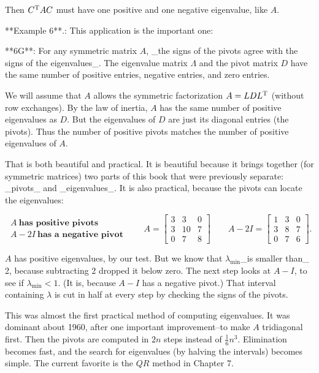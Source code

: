 Then \(C^{\rm T}AC\) must have one positive and one negative eigenvalue, like \(A\).

**Example 6**.: This application is the important one:

**6G**: For any symmetric matrix \(A\), _the signs of the pivots agree with the signs of the eigenvalues_. The eigenvalue matrix \(\Lambda\) and the pivot matrix \(D\) have the same number of positive entries, negative entries, and zero entries.

We will assume that \(A\) allows the symmetric factorization \(A=LDL^{\rm T}\) (without row exchanges). By the law of inertia, \(A\) has the same number of positive eigenvalues as \(D\). But the eigenvalues of \(D\) are just its diagonal entries (the pivots). Thus the number of positive pivots matches the number of positive eigenvalues of \(A\).

That is both beautiful and practical. It is beautiful because it brings together (for symmetric matrices) two parts of this book that were previously separate: _pivots_ and _eigenvalues_. It is also practical, because the pivots can locate the eigenvalues:

\[\begin{array}{l}A\ \textbf{has positive pivots}\\ A-2I\ \textbf{has a negative pivot}\end{array}\qquad A=\begin{bmatrix}3&3&0\\ 3&10&7\\ 0&7&8\end{bmatrix}\qquad A-2I=\begin{bmatrix}1&3&0\\ 3&8&7\\ 0&7&6\end{bmatrix}.\]

\(A\) has positive eigenvalues, by our test. But we know that \(\lambda_{\min}\)_is smaller than_ 2, because subtracting 2 dropped it below zero. The next step looks at \(A-I\), to see if \(\lambda_{\min}<1\). (It is, because \(A-I\) has a negative pivot.) That interval containing \(\lambda\) is cut in half at every step by checking the signs of the pivots.

This was almost the first practical method of computing eigenvalues. It was dominant about 1960, after one important improvement--to make \(A\) tridiagonal first. Then the pivots are computed in \(2n\) steps instead of \(\frac{1}{6}n^{3}\). Elimination becomes fast, and the search for eigenvalues (by halving the intervals) becomes simple. The current favorite is the \(QR\) method in Chapter 7.

